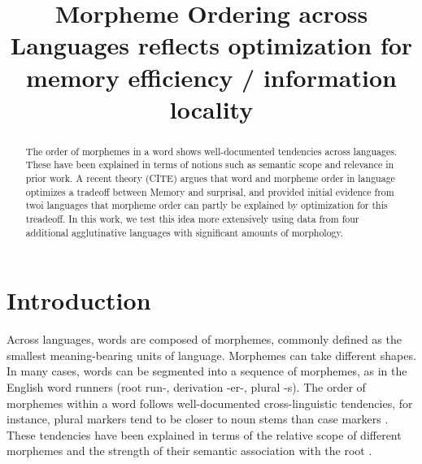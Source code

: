 \documentclass[11pt,letterpaper]{article}
\title{Morpheme Ordering across Languages reflects optimization for memory efficiency / information locality}
\begin{document}
\maketitle

\begin{abstract}
    The order of morphemes in a word shows well-documented tendencies across languages.
    These have been explained in terms of notions such as semantic scope and relevance in prior work.
A recent theory (CITE) argues that word and morpheme order in language optimizes a tradeoff between Memory and surprisal, and provided initial evidence from twoi languages that morpheme order can partly be explained by optimization for this treadeoff.
    In this work, we test this idea more extensively using data from four additional agglutinative languages with significant amounts of morphology.
    
    
\end{abstract}



\section{Introduction}

Across languages, words are composed of morphemes, commonly defined as the smallest meaning-bearing units of language.
Morphemes can take different shapes.
In many cases, words can be segmented into a sequence of morphemes, as in the English word runners (root run-, derivation -er-, plural -s).
The order of morphemes within a word follows well-documented cross-linguistic tendencies, for instance, plural markers tend to be closer to noun stems than case markers \citep[112]{greenberg1963universals}.
These tendencies have been explained in terms of the relative scope of different morphemes  \citep{givon1971historical,venneman1973explanation,baker1985the,rice2000morpheme} and the strength of their semantic association with the root \citep{bybee-morphology-1985}.
\end{document}
